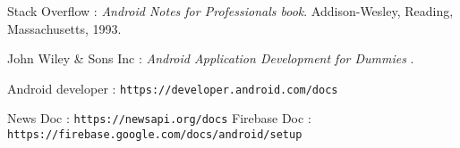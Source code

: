 
\begin{thebibliography}{9}
	Stack Overflow : 
	\textit{Android Notes for Professionals book}. 
	Addison-Wesley, Reading, Massachusetts, 1993.
	
	John Wiley \& Sons Inc :
	\textit{ Android Application Development for Dummies }.
	
	
	Android developer :
	\texttt{https://developer.android.com/docs}
	
	News Doc :
	\texttt{https://newsapi.org/docs}
	Firebase Doc :
	\texttt{https://firebase.google.com/docs/android/setup}
\end{thebibliography}
